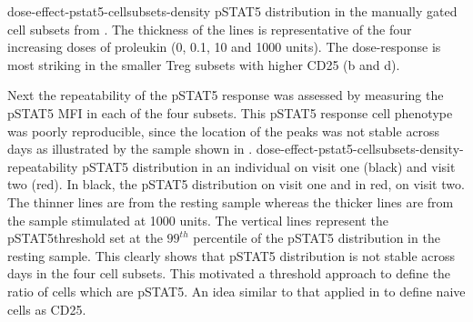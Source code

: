 {dose-effect-pstat5-cellsubsets-density}
{ pSTAT5 distribution in the manually gated cell subsets from . }
{
The thickness of the lines is representative of the four increasing doses of proleukin (0, 0.1, 10 and 1000 units).
The dose-response is most striking in the smaller Treg subsets with higher CD25 (b and d).
}

Next the repeatability of the pSTAT5 response was assessed by measuring the pSTAT5 \gls{MFI} in each of the four subsets.
This pSTAT5 response cell phenotype was poorly reproducible, since the location of the peaks was not stable across days as illustrated by the sample shown in .
{dose-effect-pstat5-cellsubsets-density-repeatability}
{ pSTAT5 distribution in an individual on visit one (black) and visit two (red).
}
{
In black, the pSTAT5 distribution on visit one and in red, on visit two.
The thinner lines are from the resting sample whereas the thicker lines are from the sample stimulated at 1000 units.
The vertical lines represent the pSTAT5\positive threshold set at the $99^{th}$ percentile of the pSTAT5 distribution in the resting sample.
This clearly shows that pSTAT5 distribution is not stable across days in the four cell subsets.
}
This motivated a threshold approach to define the ratio of cells which are pSTAT5\positive.
An idea similar to that applied in  to define naive cells as CD25\positive.
